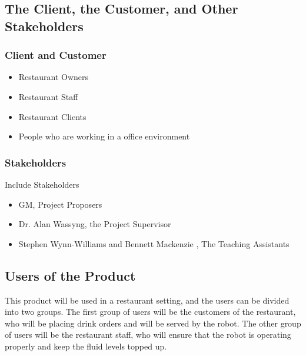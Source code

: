\documentclass [11pt]{article}
\begin{document}
\subsection{The Client, the Customer, and Other Stakeholders}

\subsubsection{Client and Customer}
	\begin{itemize}
	\item Restaurant Owners
	\item Restaurant Staff
	\item Restaurant Clients
	\item People who are working in a office environment
\end{itemize} 

\subsubsection{Stakeholders}
 Include Stakeholders
		\begin{itemize}
 		\item GM, Project Proposers 
 		\item Dr. Alan Wassyng, the Project Supervisor
 		\item Stephen Wynn-Williams and Bennett Mackenzie , The Teaching Assistants
		\end{itemize} 

\subsection{Users of the Product} 
This product will be used in a restaurant setting, and the users can be divided into two groups. The first group of users will be the customers of the restaurant, who will be placing drink orders and will be served by the robot. The other group of users will be the restaurant staff, who will ensure that the robot is operating properly and keep the fluid levels topped up.

\end{document}
